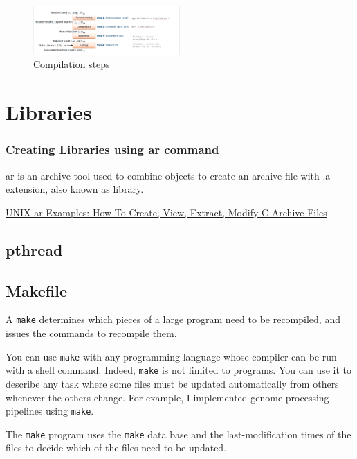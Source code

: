 \label{sec:figures}
\begin{figure}[h]
\caption{Compilation steps}
\centering
\includegraphics[width=0.5\textwidth]{./build/compilation_steps.pdf}
\end{figure}


\section{Libraries} 

\subsubsection*{Creating Libraries using ar command}%
\label{ssub:creating_libraries_using_ar_command}
ar is an archive tool used to combine objects to create an archive file with .a extension, also known as library.

\href{https://www.thegeekstuff.com/2010/08/ar-command-examples/}{UNIX ar Examples: How To Create, View, Extract, Modify C Archive Files} 

\subsection{pthread} 

\subsection{Makefile} 

A \texttt{make} determines which pieces of a large program need to be recompiled, and issues the commands to recompile them.

You can use \texttt{make} with any programming language whose compiler can be run with a shell command. Indeed, \texttt{make} is not limited to programs. You can use it to describe any task where some files must be updated automatically from others whenever the others change.
For example, I implemented genome processing pipelines using \texttt{make}.

The \texttt{make} program uses the \texttt{make} data base and the last-modification times of the files to decide which of the files need to be updated.




